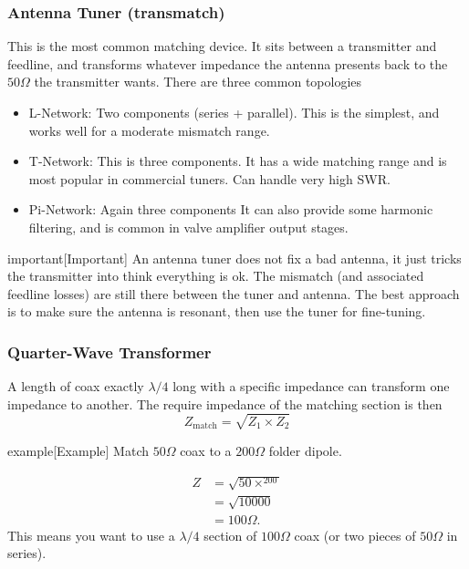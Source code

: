 \documentclass{article}
\begin{document}
\subsubsection{Antenna Tuner (transmatch)}
This is the most common matching device. It sits between a transmitter and feedline, and transforms whatever impedance the antenna presents back to the $50\Omega $ the transmitter wants. There are three common topologies
\begin{itemize}
    \item L-Network: Two components (series + parallel). This is the simplest, and works well for a moderate mismatch range.
    \item T-Network: This is three components. It has a wide matching range and is most popular in commercial tuners. Can handle very high SWR.
    \item Pi-Network: Again three components It can also provide some harmonic filtering, and is common in valve amplifier output stages.
\end{itemize}
\begin{callout}{important}[Important]
    An antenna tuner does not fix a bad antenna, it just tricks the transmitter into think everything is ok. The mismatch (and associated feedline losses) are still there between the tuner and antenna. The best approach is to make sure the antenna is resonant, then use the tuner for fine-tuning.
\end{callout}

\subsubsection{Quarter-Wave Transformer}
A length of coax exactly $\lambda /4$ long with a specific impedance can transform one impedance to another. The require impedance of the matching section is then
\[
    Z_{\text{match}}=\sqrt{Z_1\times Z_2}
\]

\begin{callout}{example}[Example]
    Match $50\Omega $ coax to a $200 \Omega $ folder dipole.
    
    \begin{align*}
        Z &= \sqrt{50\times^200} \\
          &=\sqrt{10000} \\
          &=100\Omega .
    \end{align*}
    This means you want to use a $\lambda /4$ section of $100\Omega $ coax (or two pieces of $50\Omega $ in series).
\end{callout}
\end{document}
